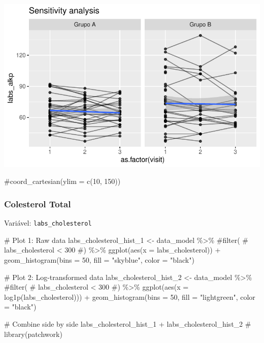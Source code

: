 \documentclass[
  12pt,
]{article}
\newenvironment{Shaded}{\begin{snugshade}}{\end{snugshade}}
\newcommand{\AttributeTok}[1]{\textcolor[rgb]{0.40,0.45,0.13}{#1}}
\newcommand{\CommentTok}[1]{\textcolor[rgb]{0.37,0.37,0.37}{#1}}
\newcommand{\DecValTok}[1]{\textcolor[rgb]{0.68,0.00,0.00}{#1}}
\newcommand{\FunctionTok}[1]{\textcolor[rgb]{0.28,0.35,0.67}{#1}}
\newcommand{\NormalTok}[1]{\textcolor[rgb]{0.00,0.23,0.31}{#1}}
\newcommand{\OtherTok}[1]{\textcolor[rgb]{0.00,0.23,0.31}{#1}}
\newcommand{\SpecialCharTok}[1]{\textcolor[rgb]{0.37,0.37,0.37}{#1}}
\newcommand{\StringTok}[1]{\textcolor[rgb]{0.13,0.47,0.30}{#1}}
\begin{document}
\includegraphics{Outcomes_files/figure-pdf/labs_alkp_6-2.pdf}

\begin{Shaded}
\begin{Highlighting}[]
    \CommentTok{\#coord\_cartesian(ylim = c(10, 150))}
\end{Highlighting}
\end{Shaded}

\subsubsection{Colesterol Total}\label{colesterol-total}

Variável: \texttt{labs\_cholesterol}

\begin{Shaded}
\begin{Highlighting}[]
\CommentTok{\# Plot 1: Raw data}
\NormalTok{labs\_cholesterol\_hist\_1 }\OtherTok{\textless{}{-}}\NormalTok{ data\_model }\SpecialCharTok{\%\textgreater{}\%} 
    \CommentTok{\#filter(}
    \CommentTok{\#    labs\_cholesterol \textless{} 300}
    \CommentTok{\#) \%\textgreater{}\% }
    \FunctionTok{ggplot}\NormalTok{(}\FunctionTok{aes}\NormalTok{(}\AttributeTok{x =}\NormalTok{ labs\_cholesterol)) }\SpecialCharTok{+} 
    \FunctionTok{geom\_histogram}\NormalTok{(}\AttributeTok{bins =} \DecValTok{50}\NormalTok{, }\AttributeTok{fill =} \StringTok{"skyblue"}\NormalTok{, }\AttributeTok{color =} \StringTok{"black"}\NormalTok{)}

\CommentTok{\# Plot 2: Log{-}transformed data}
\NormalTok{labs\_cholesterol\_hist\_2 }\OtherTok{\textless{}{-}}\NormalTok{ data\_model }\SpecialCharTok{\%\textgreater{}\%} 
    \CommentTok{\#filter(}
    \CommentTok{\#    labs\_cholesterol \textless{} 300}
    \CommentTok{\#) \%\textgreater{}\%}
    \FunctionTok{ggplot}\NormalTok{(}\FunctionTok{aes}\NormalTok{(}\AttributeTok{x =} \FunctionTok{log1p}\NormalTok{(labs\_cholesterol))) }\SpecialCharTok{+} 
    \FunctionTok{geom\_histogram}\NormalTok{(}\AttributeTok{bins =} \DecValTok{50}\NormalTok{, }\AttributeTok{fill =} \StringTok{"lightgreen"}\NormalTok{, }\AttributeTok{color =} \StringTok{"black"}\NormalTok{)}

\CommentTok{\# Combine side by side}
\NormalTok{labs\_cholesterol\_hist\_1 }\SpecialCharTok{+}\NormalTok{ labs\_cholesterol\_hist\_2 }\CommentTok{\# library(patchwork)}
\end{Highlighting}
\end{Shaded}
\end{document}
